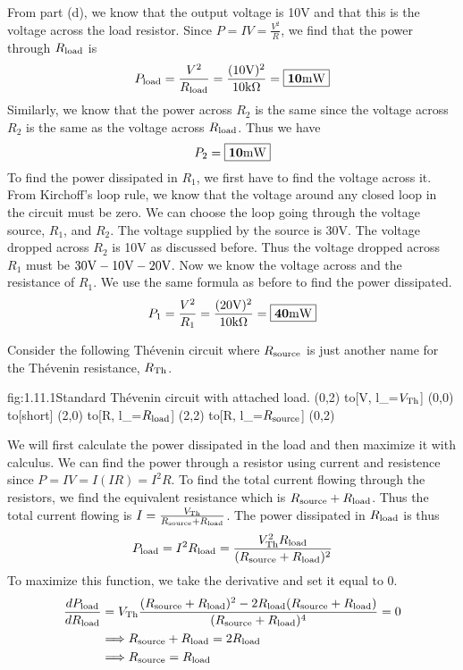 \documentclass{article}
\begin{document}
\begin{enumerate}
        From part (d), we know that the output voltage is 10V and that this is the voltage across the load resistor. Since $P = IV = \frac{V^2}{R}$, we find that the power through $R_{\text{load}}$ is 
        \[P_{\text{load}} = \frac{V^2}{R_{\text{load}}} = \frac{(10\text{V})^2}{10\text{k}\Omega} = \boxed{\mathbf{10\text{m}\text{W}}}\]
        Similarly, we know that the power across $R_2$ is the same since the voltage across $R_2$ is the same as the voltage across $R_{\text{load}}$. Thus we have
        \[P_2 = \boxed{\mathbf{10\text{m}\text{W}}}\]
        To find the power dissipated in $R_1$, we first have to find the voltage across it. From Kirchoff's loop rule, we know that the voltage around any closed loop in the circuit must be zero. We can choose the loop going through the voltage source, $R_1$, and $R_2$. The voltage supplied by the source is 30V. The voltage dropped across $R_2$ is 10V as discussed before. Thus the voltage dropped across $R_1$ must be $30\text{V} - 10\text{V} - 20\text{V}$. Now we know the voltage across and the resistance of $R_1$. We use the same formula as before to find the power dissipated.
        \[P_1 = \frac{V^2}{R_1} = \frac{(20\text{V})^2}{10\text{k}\Omega} = \boxed{\mathbf{40\text{m}\text{W}}}\]
    \end{enumerate}

    Consider the following Th\'evenin circuit where $R_{\text{source}}$ is just another name for the Th\'evenin resistance, $R_{\text{Th}}$.
    \begin{circuit}{fig:1.11.1}{Standard Th\'evenin circuit with attached load.}
        (0,2) to[V, l_=$V_{\text{Th}}$] (0,0)
            to[short] (2,0)
            to[R, l_=$R_{\text{load}}$] (2,2)
            to[R, l_=$R_{\text{source}}$] (0,2)
    \end{circuit}
    We will first calculate the power dissipated in the load and then maximize it with calculus. We can find the power through a resistor using current and resistence since $P = IV = I(IR) = I^2R$. To find the total current flowing through the resistors, we find the equivalent resistance which is $R_{\text{source}} + R_{\text{load}}$. Thus the total current flowing is $I = \frac{V_{\text{Th}}}{R_{\text{source}} + R_{\text{load}}}$. The power dissipated in $R_{\text{load}}$ is thus 
    \[P_{\text{load}} = I^2R_{\text{load}} = \frac{V_{\text{Th}}^2 R_{\text{load}}}{(R_{\text{source}} + R_{\text{load}})^2}\]
    To maximize this function, we take the derivative and set it equal to 0.
    \begin{align*}
        \frac{dP_{\text{load}}}{dR_{\text{load}}} &= V_{\text{Th}} \frac{(R_{\text{source}} + R_{\text{load}})^2 - 2R_{\text{load}}(R_{\text{source}} + R_{\text{load}})}{(R_{\text{source}} + R_{\text{load}})^4} = 0 \\
        &\Longrightarrow R_{\text{source}} + R_{\text{load}} = 2R_{\text{load}} \\
        &\Longrightarrow R_{\text{source}} = R_{\text{load}}
    \end{align*}
\end{document}
